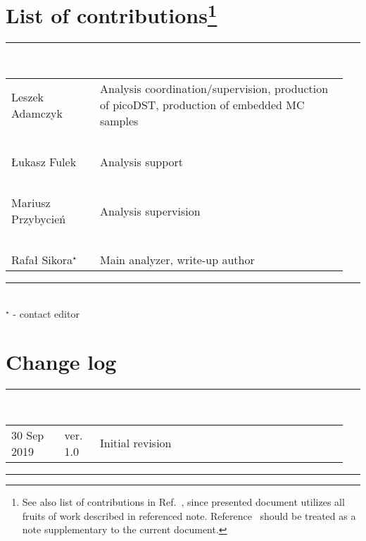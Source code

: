 \section*{\LARGE List of contributions\footnote{See also list of contributions in Ref.~\cite{supplementaryNote}, since presented document utilizes all fruits of work described in referenced note. Reference~\cite{supplementaryNote} should be treated as a note supplementary to the current document.}}%
%
   \rule{\textwidth}{1.0pt}\\[5pt]%
      \begin{tabular}{>{\raggedright}p{0.25\linewidth}p{0.7\linewidth}}
		Leszek Adamczyk & Analysis coordination/supervision, production of picoDST, production of embedded MC samples\\
		~&~\\
		Łukasz Fulek & Analysis support\\
		~&~\\
		Mariusz Przybycień & Analysis supervision\\
		~&~\\
        Rafał Sikora$^{\star}$  & Main analyzer, write-up author\\
      \end{tabular}\newline
   \rule{\textwidth}{1.0pt}\\[10pt]%
   $^{\star}$ - contact editor
   \\[50pt]%
\section*{\LARGE Change log}%
%
  \rule{\textwidth}{1.0pt}\\[5pt]%
  \begin{tabular}{>{\raggedright}p{0.15\linewidth}p{0.1\linewidth}p{0.7\linewidth}}
  	30 Sep 2019 & ver. 1.0 & Initial revision
  \end{tabular}\newline%
 \rule{\textwidth}{1.0pt}
